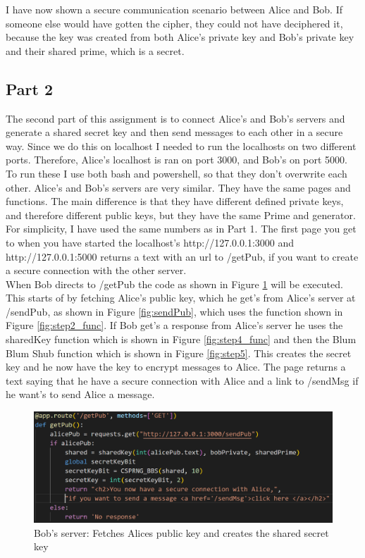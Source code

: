 \documentclass[12pt, letterpaper]{article}
\begin{document}
I have now shown a secure communication scenario between Alice and Bob. If someone else would have gotten the cipher, they could not have deciphered it, because the key was created from both Alice's private key and Bob's private key and their shared prime, which is a secret. 

\subsection*{Part 2}
The second part of this assignment is to connect Alice's and Bob's servers and generate a shared secret key and then send messages to each other in a secure way. Since we do this on localhost I needed to run the localhosts on two different ports. Therefore, Alice's localhost is ran on port 3000, and Bob's on port 5000. To run these I use both bash and powershell, so that they don't overwrite each other. Alice's and Bob's servers are very similar. They have the same pages and functions. The main difference is that they have different defined private keys, and therefore different public keys, but they have the same Prime and generator. For simplicity, I have used the same numbers as in Part 1. The first page you get to when you have started the localhost's http://127.0.0.1:3000 and http://127.0.0.1:5000 returns a text with an url to /getPub, if you want to create a secure connection with the other server. 
\\
When Bob directs to /getPub the code as shown in Figure \ref{fig:getPub} will be executed. This starts of by fetching Alice's public key, which he get's from Alice's server at /sendPub, as shown in Figure \ref{fig:sendPub}, which uses the function shown in Figure \ref{fig:step2_func}. If Bob get's a response from Alice's server he uses the sharedKey function which is shown in Figure \ref{fig:step4_func} and then the Blum Blum Shub function which is shown in Figure \ref{fig:step5}. This creates the secret key and he now have the key to encrypt messages to Alice. The page returns a text saying that he have a secure connection with Alice and a link to /sendMsg if he want's to send Alice a message.

\begin{figure}[H]
  \includegraphics[width=\linewidth]{code_snippets/getPub.PNG}
  \caption{Bob's server: Fetches Alices public key and creates the shared secret key}
  \label{fig:getPub}
\end{figure}
\end{document}
